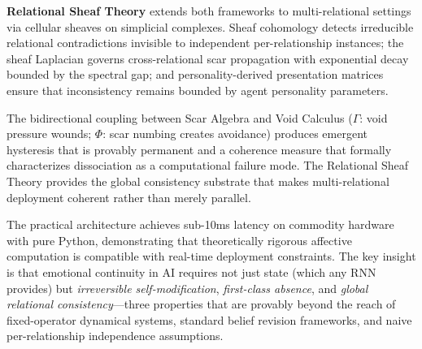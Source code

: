 \documentclass[11pt]{article}
\begin{document}
\textbf{Relational Sheaf Theory} extends both frameworks to multi-relational settings via cellular sheaves on simplicial complexes. Sheaf cohomology detects irreducible relational contradictions invisible to independent per-relationship instances; the sheaf Laplacian governs cross-relational scar propagation with exponential decay bounded by the spectral gap; and personality-derived presentation matrices ensure that inconsistency remains bounded by agent personality parameters.

The bidirectional coupling between Scar Algebra and Void Calculus ($\Gamma$: void pressure wounds; $\Phi$: scar numbing creates avoidance) produces emergent hysteresis that is provably permanent and a coherence measure that formally characterizes dissociation as a computational failure mode. The Relational Sheaf Theory provides the global consistency substrate that makes multi-relational deployment coherent rather than merely parallel.

The practical architecture achieves sub-10ms latency on commodity hardware with pure Python, demonstrating that theoretically rigorous affective computation is compatible with real-time deployment constraints. The key insight is that emotional continuity in AI requires not just state (which any RNN provides) but \emph{irreversible self-modification}, \emph{first-class absence}, and \emph{global relational consistency}---three properties that are provably beyond the reach of fixed-operator dynamical systems, standard belief revision frameworks, and naive per-relationship independence assumptions.


\end{document}

